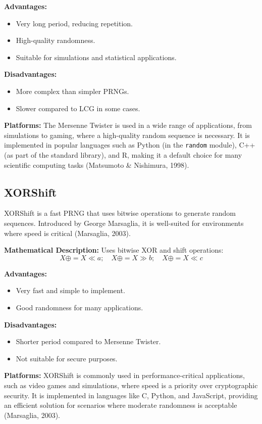 \documentclass[a4paper,12pt]{report}
\begin{document}
\textbf{Advantages:}
\begin{itemize}
    \item Very long period, reducing repetition.
    \item High-quality randomness.
    \item Suitable for simulations and statistical applications.
\end{itemize}

\textbf{Disadvantages:}
\begin{itemize}
    \item More complex than simpler PRNGs.
    \item Slower compared to LCG in some cases.
\end{itemize}

\textbf{Platforms:} The Mersenne Twister is used in a wide range of applications, from simulations to gaming, where a high-quality random sequence is necessary. It is implemented in popular languages such as Python (in the \texttt{random} module), C++ (as part of the standard library), and R, making it a default choice for many scientific computing tasks (Matsumoto \& Nishimura, 1998).

\subsection{XORShift}

XORShift is a fast PRNG that uses bitwise operations to generate random sequences. Introduced by George Marsaglia, it is well-suited for environments where speed is critical (Marsaglia, 2003).

\textbf{Mathematical Description:} 
Uses bitwise XOR and shift operations:
\[X \oplus= X \ll a; \quad X \oplus= X \gg b; \quad X \oplus= X \ll c\]

\textbf{Advantages:}
\begin{itemize}
    \item Very fast and simple to implement.
    \item Good randomness for many applications.
\end{itemize}

\textbf{Disadvantages:}
\begin{itemize}
    \item Shorter period compared to Mersenne Twister.
    \item Not suitable for secure purposes.
\end{itemize}

\textbf{Platforms:} XORShift is commonly used in performance-critical applications, such as video games and simulations, where speed is a priority over cryptographic security. It is implemented in languages like C, Python, and JavaScript, providing an efficient solution for scenarios where moderate randomness is acceptable (Marsaglia, 2003).
\end{document}
